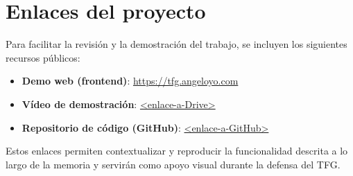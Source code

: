 \section{Enlaces del proyecto}

Para facilitar la revisión y la demostración del trabajo, se incluyen los siguientes recursos públicos:

\begin{itemize}
    \item \textbf{Demo web (frontend)}: \url{https://tfg.angeloyo.com}
    \item \textbf{Vídeo de demostración}: \url{<enlace-a-Drive>}
    \item \textbf{Repositorio de código (GitHub)}: \url{<enlace-a-GitHub>}
\end{itemize}

Estos enlaces permiten contextualizar y reproducir la funcionalidad descrita a lo largo de la memoria y servirán como apoyo visual durante la defensa del TFG.

